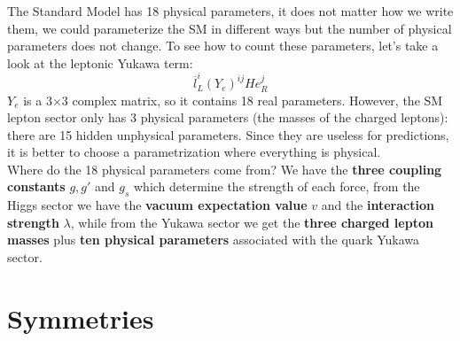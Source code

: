 \documentclass[../main.tex]{subfiles}
\begin{document}
The Standard Model has 18 physical parameters, it does not matter how we write them, we could parameterize the SM in different ways but the number of physical parameters does not change. To see how to count these parameters, let's take a look at the leptonic Yukawa term:
\[
\overline{l}_L^i(Y_e)^{ij}He_R^j
\]
$Y_e$ is a 3$\times$3 complex matrix, so it contains 18 real parameters. However, the SM lepton sector only has 3 physical parameters (the masses of the charged leptons): there are 15 hidden unphysical parameters. Since they are useless for predictions, it is better to choose a parametrization where everything is physical.\\
Where do the 18 physical parameters come from? We have the \textbf{three coupling constants} $g, g'$ and $g_s$ which determine the strength of each force, from the Higgs sector we have the \textbf{vacuum expectation value} $v$ and the \textbf{interaction strength} $\lambda$, while from the Yukawa sector we get the \textbf{three charged lepton masses} plus \textbf{ten physical parameters} associated with the quark Yukawa sector. 
\section{Symmetries}
\end{document}
